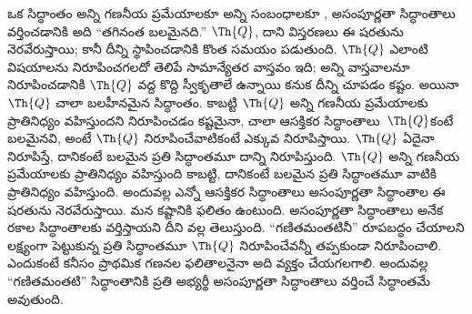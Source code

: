\documentclass[../../../include/open-logic-section]{subfiles}
\begin{document}
ఒక సిద్ధాంతం అన్ని గణనీయ ప్రమేయాలకూ అన్ని
 సంబంధాలకూ
, అసంపూర్ణతా సిద్ధాంతాలు వర్తించడానికి
అది ``తగినంత బలమైనది.'' $\Th{Q}$, దాని విస్తరణలు ఈ షరతును నెరవేరుస్తాయి;
కానీ దీన్ని స్థాపించడానికి కొంత సమయం పడుతుంది. $\Th{Q}$ ఎలాంటి విషయాలను
నిరూపించగలదో తెలిపే సామాన్యేతర వాస్తవం ఇది; అన్ని వాస్తవాలనూ నిరూపించడానికి
$\Th{Q}$ వద్ద కొద్ది స్వీకృతాలే ఉన్నాయి కనుక దీన్ని చూపడం కష్టం. అయినా $\Th{Q}$
చాలా బలహీనమైన సిద్ధాంతం. కాబట్టి $\Th{Q}$ అన్ని గణనీయ ప్రమేయాలకు ప్రాతినిధ్యం
వహిస్తుందని నిరూపించడం కష్టమైనా, చాలా ఆసక్తికర సిద్ధాంతాలు~$\Th{Q}$కంటే బలమైనవి,
అంటే $\Th{Q}$ నిరూపించేవాటికంటే ఎక్కువ నిరూపిస్తాయి. $\Th{Q}$ ఏదైనా
నిరూపిస్తే, దానికంటే బలమైన ప్రతి సిద్ధాంతమూ దాన్ని నిరూపిస్తుంది. $\Th{Q}$
అన్ని గణనీయ ప్రమేయాలకు ప్రాతినిధ్యం వహిస్తుంది కాబట్టి, దానికంటే బలమైన
ప్రతి సిద్ధాంతమూ వాటికి ప్రాతినిధ్యం వహిస్తుంది.
అందువల్ల ఎన్నో ఆసక్తికర సిద్ధాంతాలు అసంపూర్ణతా సిద్ధాంతాల ఈ షరతును నెరవేరుస్తాయి.
మన కష్టానికి ఫలితం ఉంటుంది. అసంపూర్ణతా సిద్ధాంతాలు అనేక రకాల
సిద్ధాంతాలకు వర్తిస్తాయని దీని వల్ల తెలుస్తుంది. ``గణితమంతటినీ'' రూపబద్ధం చేయాలని
లక్ష్యంగా పెట్టుకున్న ప్రతి సిద్ధాంతమూ $\Th{Q}$ నిరూపించేవన్నీ తప్పకుండా
నిరూపించాలి. ఎందుకంటే కనీసం ప్రాథమిక గణనల ఫలితాలనైనా అది వ్యక్తం చేయగలగాలి. అందువల్ల
``గణితమంతటి'' సిద్ధాంతానికి ప్రతి అభ్యర్థీ అసంపూర్ణతా సిద్ధాంతాలు వర్తించే
సిద్ధాంతమే అవుతుంది.
\end{document}
